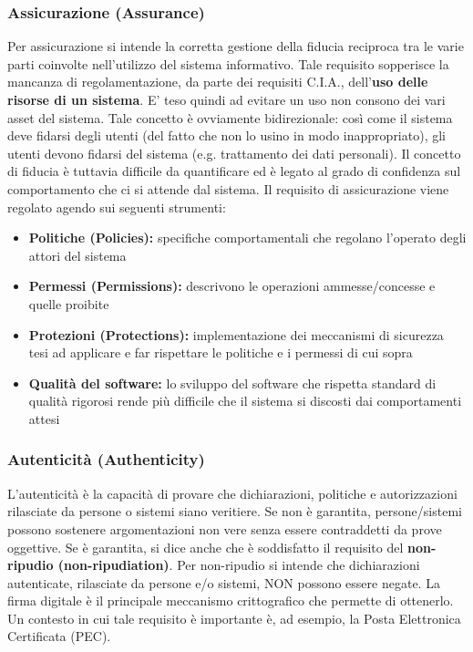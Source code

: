 \subsubsection{Assicurazione (Assurance)}
Per assicurazione si intende la corretta gestione della fiducia reciproca tra le varie parti coinvolte nell'utilizzo del sistema informativo. Tale requisito sopperisce la mancanza di regolamentazione, da parte dei requisiti C.I.A., dell'\textbf{uso delle risorse di un sistema}. E' teso quindi ad evitare un uso non consono dei vari asset del sistema. Tale concetto è ovviamente bidirezionale: così come il sistema deve fidarsi degli utenti (del fatto che non lo usino in modo inappropriato), gli utenti devono fidarsi del sistema (e.g. trattamento dei dati personali). Il concetto di fiducia è tuttavia difficile da quantificare ed è legato al grado di confidenza sul comportamento che ci si attende dal sistema. Il requisito di assicurazione viene regolato agendo sui seguenti strumenti:
\begin{itemize} 
  \item \textbf{Politiche (Policies):} specifiche comportamentali che regolano l’operato degli attori del sistema
  \item \textbf{Permessi (Permissions):} descrivono le operazioni ammesse/concesse e quelle proibite
  \item \textbf{Protezioni (Protections):} implementazione dei meccanismi di sicurezza tesi ad applicare e far rispettare le politiche e i permessi di cui sopra
  \item \textbf{Qualità del software:} lo sviluppo del software che rispetta standard di qualità rigorosi rende più difficile che il sistema si discosti dai comportamenti attesi 
\end{itemize}

\subsubsection{Autenticità (Authenticity)}
L'autenticità è la capacità di provare che dichiarazioni, politiche e autorizzazioni rilasciate da persone o sistemi siano veritiere. Se non è garantita, persone/sistemi possono sostenere argomentazioni non vere senza essere contraddetti da prove oggettive. Se è garantita, si dice anche che è soddisfatto il requisito del \textbf{non-ripudio (non-ripudiation)}. Per non-ripudio si intende che dichiarazioni autenticate, rilasciate da persone e/o sistemi, NON possono essere negate. La firma digitale è il principale meccanismo crittografico che permette di ottenerlo. Un contesto in cui tale requisito è importante è, ad esempio, la Posta Elettronica Certificata (PEC).

